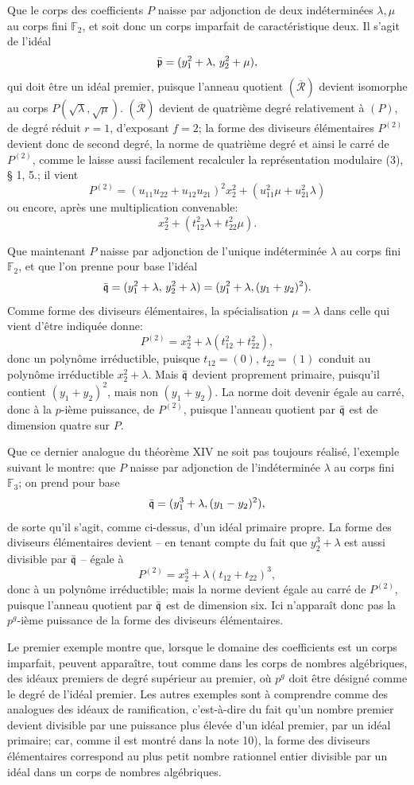Que le corps des coefficients $P$ naisse par adjonction de deux indéterminées $\lambda,\mu$ au corps fini $\mathbb F_2$, et soit donc un corps imparfait de caractéristique deux. Il s'agit de l'idéal
\[
 \bar{\mathfrak p}=(y_1^2+\lambda,\,y_2^2+\mu),
\]
qui doit être un idéal premier, puisque l'anneau quotient $(\overline{\mathcal R})$ devient isomorphe au corps $P(\sqrt\lambda,\sqrt\mu)$. $(\overline{\mathcal R})$ devient de quatrième degré relativement à $(P)$, de degré réduit $r=1$, d'exposant $f=2$; la forme des diviseurs élémentaires $P^{(2)}$ devient donc de second degré, la norme de quatrième degré et ainsi le carré de $P^{(2)}$, comme le laisse aussi facilement recalculer la représentation modulaire (3), \S{} 1, 5.; il vient
\[
 P^{(2)}=(u_{11}u_{22}+u_{12}u_{21})^2x_2^2+(u_{11}^2\mu+u_{21}^2\lambda)
\]
ou encore, après une multiplication convenable:
\[
 x_2^2+(t_{12}^2\lambda+t_{22}^2\mu).
\]

Que maintenant $P$ naisse par adjonction de l'unique indéterminée $\lambda$ au corps fini $\mathbb F_2$, et que l'on prenne pour base l'idéal
\[
 \bar{\mathfrak q}=(y_1^2+\lambda,\,y_2^2+\lambda)=(y_1^2+\lambda,(y_1+y_2)^2).
\]
Comme forme des diviseurs élémentaires, la spécialisation $\mu=\lambda$ dans celle qui vient d'être indiquée donne:
\[
 P^{(2)}=x_2^2+\lambda(t_{12}^2+t_{22}^2),
\]
donc un polynôme irréductible, puisque $t_{12}=(0)$, $t_{22}=(1)$ conduit au polynôme irréductible $x_2^2+\lambda$. Mais $\bar{\mathfrak q}$ devient proprement primaire, puisqu'il contient $(y_1+y_2)^2$, mais non $(y_1+y_2)$. La norme doit devenir égale au carré, donc à la $p$-ième puissance, de $P^{(2)}$, puisque l'anneau quotient par $\bar{\mathfrak q}$ est de dimension quatre sur $P$.

Que ce dernier analogue du théorème XIV ne soit pas toujours réalisé, l'exemple suivant le montre: que $P$ naisse par adjonction de l'indéterminée $\lambda$ au corps fini $\mathbb F_3$; on prend pour base
\[
 \bar{\mathfrak q}=(y_1^3+\lambda,(y_1-y_2)^2),
\]
de sorte qu'il s'agit, comme ci-dessus, d'un idéal primaire propre. La forme des diviseurs élémentaires devient -- en tenant compte du fait que $y_2^3+\lambda$ est aussi divisible par $\bar{\mathfrak q}$ -- égale à
\[
 P^{(2)}=x_2^3+\lambda(t_{12}+t_{22})^3,
\]
donc à un polynôme irréductible; mais la norme devient égale au carré de $P^{(2)}$, puisque l'anneau quotient par $\bar{\mathfrak q}$ est de dimension six. Ici n'apparaît donc pas la $p^g$-ième puissance de la forme des diviseurs élémentaires.

Le premier exemple montre que, lorsque le domaine des coefficients est un corps imparfait, peuvent apparaître, tout comme dans les corps de nombres algébriques, des idéaux premiers de degré supérieur au premier, où $p^g$ doit être désigné comme le degré de l'idéal premier. Les autres exemples sont à comprendre comme des analogues des idéaux de ramification, c'est-à-dire du fait qu'un nombre premier devient divisible par une puissance plus élevée d'un idéal premier, par un idéal primaire; car, comme il est montré dans la note 10), la forme des diviseurs élémentaires correspond au plus petit nombre rationnel entier divisible par un idéal dans un corps de nombres algébriques.
